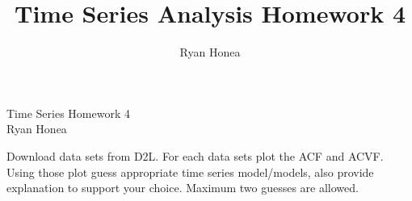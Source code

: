 \documentclass[10pt,a4paper]{exam}
\author{Ryan Honea}
\title{Time Series Analysis Homework 4}
\begin{document}
\begin{center}
Time Series Homework 4\\
Ryan Honea
\end{center}
\begin{questions}
\question Download data sets from D2L. For each data sets plot the ACF and ACVF. Using those plot guess appropriate time series model/models, also provide explanation to support your choice. Maximum two guesses are allowed.
\end{questions}
\end{document}
